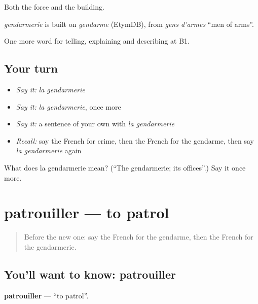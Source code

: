 Both the force and the building.

\begin{cousinweb}
\emph{gendarmerie} is built on \emph{gendarme} (EtymDB), from \emph{gens d'armes} \textquotedblleft{}men of arms\textquotedblright{}.
\end{cousinweb}

\begin{grammarlens}[title={What you've built}]
One more word for telling, explaining and describing at B1.
\end{grammarlens}

\subsection*{Your turn}
\begin{itemize}
\raggedright
  \item \emph{Say it:} \emph{la gendarmerie}
  \item \emph{Say it:} \emph{la gendarmerie}, once more
  \item \emph{Say it:} a sentence of your own with \emph{la gendarmerie}
  \item \emph{Recall:} say the French for crime, then the French for the gendarme, then say \emph{la gendarmerie} again
\end{itemize}

\begin{tcolorbox}[breakable,colback=teal!4,colframe=teal!35!black,title={Before you move on}]
What does la gendarmerie mean? (\textquotedblleft{}The gendarmerie; its offices\textquotedblright{}.) Say it once more.
\end{tcolorbox}
\section[patrouiller]{patrouiller — to patrol}

\label{lesson:FR-C291-patrouiller}



\begin{quote}
Before the new one: say the French for the gendarme, then the French for the gendarmerie.
\end{quote}

\subsection*{You'll want to know: patrouiller}
\textbf{patrouiller} — \textquotedblleft{}to patrol\textquotedblright{}.

